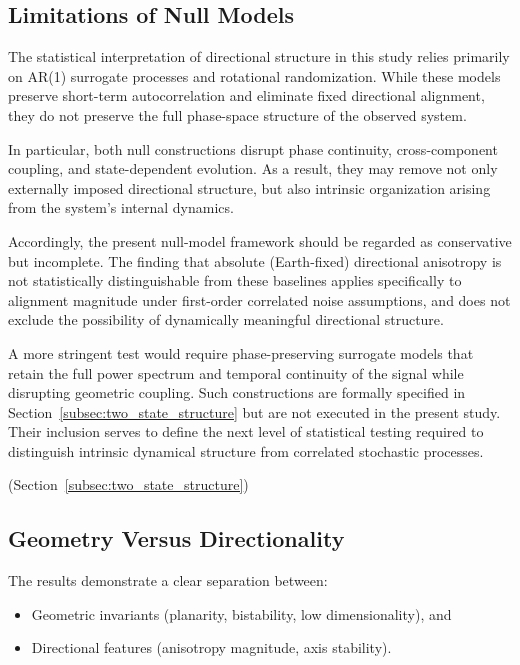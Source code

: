 \documentclass[twocolumn,9pt]{revtex4-2}
\begin{document}
\subsection{Limitations of Null Models}
\label{subsec:limitations_of_null_models}

The statistical interpretation of directional structure in this study relies primarily on AR(1) surrogate processes and rotational randomization. While these models preserve short-term autocorrelation and eliminate fixed directional alignment, they do not preserve the full phase-space structure of the observed system.

In particular, both null constructions disrupt phase continuity, cross-component coupling, and state-dependent evolution. As a result, they may remove not only externally imposed directional structure, but also intrinsic organization arising from the system's internal dynamics.

Accordingly, the present null-model framework should be regarded as conservative but incomplete. The finding that absolute (Earth-fixed) directional anisotropy is not statistically distinguishable from these baselines applies specifically to alignment magnitude under first-order correlated noise assumptions, and does not exclude the possibility of dynamically meaningful directional structure.

A more stringent test would require phase-preserving surrogate models that retain the full power spectrum and temporal continuity of the signal while disrupting geometric coupling. Such constructions are formally specified in Section~\ref{subsec:two_state_structure} but are not executed in the present study. Their inclusion serves to define the next level of statistical testing required to distinguish intrinsic dynamical structure from correlated stochastic processes.

(Section~\ref{subsec:two_state_structure})

\subsection{Geometry Versus Directionality}
\label{subsec:geometry_versus_directionality}

The results demonstrate a clear separation between:
\begin{itemize}
    \item Geometric invariants (planarity, bistability, low dimensionality), and
    \item Directional features (anisotropy magnitude, axis stability).
\end{itemize}
\end{document}
